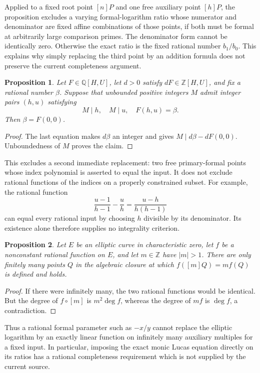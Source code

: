 \documentclass[11pt]{article}
\newtheorem{proposition}{Proposition}
\newcommand{\Z}{\mathbb Z}
\newcommand{\Q}{\mathbb Q}
\begin{document}
Applied to a fixed root point $[n]P$ and one free auxiliary point
$[h]P$, the proposition excludes a varying formal-logarithm ratio
whose numerator and denominator are fixed affine combinations of
those points, if both must be formal at arbitrarily large comparison
primes. The denominator form cannot be identically zero. Otherwise
the exact ratio is the fixed rational number $b_1/b_0$. This explains
why simply replacing the third point by an addition formula does not
preserve the current completeness argument.

\begin{proposition}
Let $F\in\Q[H,U]$, let $d>0$ satisfy $dF\in\Z[H,U]$, and
fix a rational number $\beta$. Suppose that unbounded positive
integers $M$ admit integer pairs $(h,u)$ satisfying
\[
           M\mid h,\quad M\mid u,\quad F(h,u)=\beta.
\]
Then $\beta=F(0,0)$.
\end{proposition}
\begin{proof}
The last equation makes $d\beta$ an integer and gives
$M\mid d\beta-dF(0,0)$. Unboundedness of $M$ proves the claim.
\end{proof}

This excludes a second immediate replacement: two free primary-formal
points whose index polynomial is asserted to equal the input. It does
not exclude rational functions of the indices on a properly constrained
subset. For example, the rational function
\[
       \frac{u-1}{h-1}-\frac uh
          =\frac{u-h}{h(h-1)}
\]
can equal every rational input by choosing $h$ divisible by its
denominator. Its existence alone therefore supplies no integrality
criterion.

\begin{proposition}
Let $E$ be an elliptic curve in characteristic zero, let $f$ be a
nonconstant rational function on $E$, and let $m\in\Z$ have
$|m|>1$. There are only finitely many points $Q$ in the algebraic
closure at which $f([m]Q)=mf(Q)$ is defined and holds.
\end{proposition}
\begin{proof}
If there were infinitely many, the two rational functions would be
identical. But the degree of $f\circ[m]$ is $m^2\deg f$, whereas
the degree of $mf$ is $\deg f$, a contradiction.
\end{proof}

Thus a rational formal parameter such as $-x/y$ cannot replace the
elliptic logarithm by an exactly linear function on infinitely many
auxiliary multiples for a fixed input. In particular, imposing the
exact monic Lucas equation directly on its ratios has a rational
completeness requirement which is not supplied by the current source.
\end{document}
